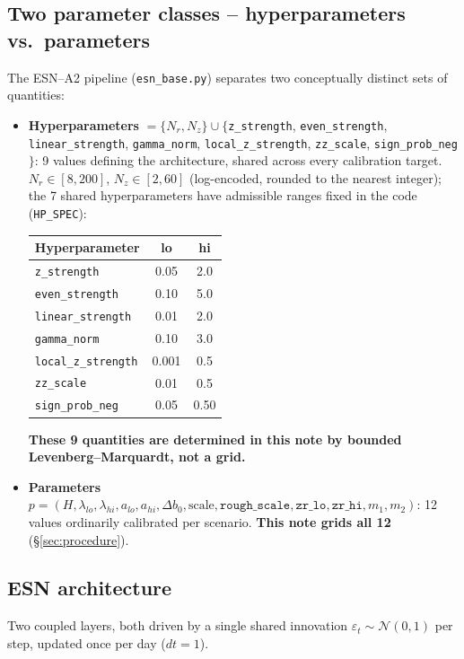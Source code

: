 \documentclass[11pt]{article}
\begin{document}
\subsection{Two parameter classes -- hyperparameters vs.\ parameters}
The ESN--A2 pipeline (\texttt{esn\_base.py}) separates two conceptually distinct sets of
quantities:
\begin{itemize}
\item \textbf{Hyperparameters} $=\{N_r, N_z\} \cup \{$\texttt{z\_strength},
\texttt{even\_strength}, \texttt{linear\_strength}, \texttt{gamma\_norm},
\texttt{local\_z\_strength}, \texttt{zz\_scale}, \texttt{sign\_prob\_neg}$\}$: 9 values
defining the architecture, shared across every calibration target. $N_r\in[8,200]$,
$N_z\in[2,60]$ (log-encoded, rounded to the nearest integer); the 7 shared
hyperparameters have admissible ranges fixed in the code (\texttt{HP\_SPEC}):
\begin{center}
\begin{tabular}{lcc}
\toprule
Hyperparameter & lo & hi \\
\midrule
\texttt{z\_strength} & 0.05 & 2.0 \\
\texttt{even\_strength} & 0.10 & 5.0 \\
\texttt{linear\_strength} & 0.01 & 2.0 \\
\texttt{gamma\_norm} & 0.10 & 3.0 \\
\texttt{local\_z\_strength} & 0.001 & 0.5 \\
\texttt{zz\_scale} & 0.01 & 0.5 \\
\texttt{sign\_prob\_neg} & 0.05 & 0.50 \\
\bottomrule
\end{tabular}
\end{center}
\textbf{These 9 quantities are determined in this note by bounded
Levenberg--Marquardt, not a grid.}
\item \textbf{Parameters} $p=(H,\lambda_{lo},\lambda_{hi},a_{lo},a_{hi},\Delta b_0,
\text{scale},\texttt{rough\_scale},\texttt{zr\_lo},\texttt{zr\_hi},m_1,m_2)$: 12 values
ordinarily calibrated per scenario. \textbf{This note grids all 12} (\S\ref{sec:procedure}).
\end{itemize}

\subsection{ESN architecture}
Two coupled layers, both driven by a single shared innovation
$\varepsilon_t\sim\mathcal N(0,1)$ per step, updated once per day ($dt=1$).
\end{document}
